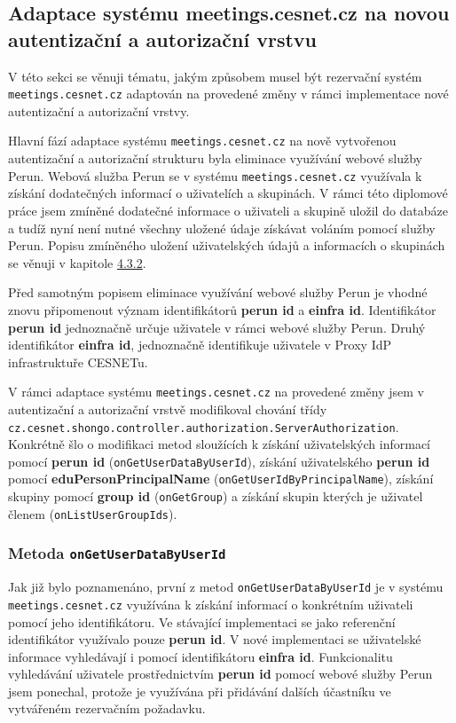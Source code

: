 \documentclass[
  printed, %
  twoside, %
  table,   %
  nolof,     %
  nolot,     %
]{fithesis3}
\begin{document}
\subsection{Adaptace systému meetings.cesnet.cz na novou autentizační a autorizační vrstvu}
\label{ShongoImpl-web}
V této sekci se věnuji tématu, jakým způsobem musel být rezervační systém \texttt{meetings.cesnet.cz} adaptován na provedené změny v rámci implementace nové autentizační a autorizační vrstvy. 
\par

Hlavní fází adaptace systému \texttt{meetings.cesnet.cz} na nově vytvořenou autentizační a autorizační strukturu byla eliminace využívání webové služby Perun. Webová služba Perun se v systému \texttt{meetings.cesnet.cz} využívala k získání dodatečných informací o uživatelích a skupinách. V rámci této diplomové práce jsem zmíněné dodatečné informace o uživateli a skupině uložil do databáze a tudíž nyní není nutné všechny uložené údaje získávat voláním pomocí služby Perun. Popisu zmíněného uložení uživatelských údajů a informacích o skupinách se věnuji v kapitole \hyperref[zpracovaniAUlozeniPerun]{4.3.2}. 

\par
Před samotným popisem eliminace využívání webové služby Perun je vhodné znovu připomenout význam identifikátorů \textbf{perun id} a \textbf{einfra id}. Identifikátor \textbf{perun id} jednoznačně určuje uživatele v rámci webové služby Perun. Druhý identifikátor \textbf{einfra id}, jednoznačně identifikuje uživatele v Proxy IdP infrastruktuře CESNETu. 
\par V rámci adaptace systému \texttt{meetings.cesnet.cz} na provedené změny jsem v autentizační a autorizační vrstvě modifikoval chování třídy \texttt{cz.cesnet.shongo.controller.authorization.ServerAuthorization}. Konkrétně šlo o modifikaci metod sloužících k získání uživatelských informací pomocí \textbf{perun id} (\texttt{onGetUserDataByUserId}), získání uživatelského \textbf{perun id} pomocí \textbf{eduPersonPrincipalName} (\texttt{onGetUserIdByPrincipalName}), získání skupiny pomocí \textbf{group id} (\texttt{onGetGroup}) a získání skupin kterých je uživatel členem (\texttt{onListUserGroupIds}). 


\subsubsection{Metoda \texttt{onGetUserDataByUserId}}

Jak již bylo poznamenáno, první z metod \texttt{onGetUserDataByUserId} je v systému \texttt{meetings.cesnet.cz} využívána k získání informací o konkrétním uživateli pomocí jeho identifikátoru. Ve stávající implementaci se jako referenční identifikátor využívalo pouze \textbf{perun id}. V nové implementaci se uživatelské informace vyhledávají i pomocí identifikátoru \textbf{einfra id}. Funkcionalitu vyhledávání uživatele prostřednictvím \textbf{perun id} pomocí webové služby Perun jsem ponechal, protože je využívána při přidávání dalších účastníku ve vytvářeném rezervačním požadavku. 
\end{document}
